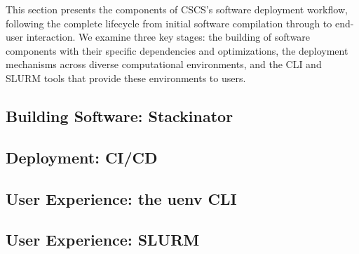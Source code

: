 This section presents the components of CSCS's software deployment workflow, following the complete lifecycle from initial software compilation through to end-user interaction.
We examine three key stages: the building of software components with their specific dependencies and optimizations, the deployment mechanisms across diverse computational environments, and the CLI and SLURM tools that provide these environments to users.

\subsection{Building Software: Stackinator}
\label{sec:stackinator}


\subsection{Deployment: CI/CD}
\label{sec:cicd}


\subsection{User Experience: the uenv CLI}
\label{sec:cli}


\subsection{User Experience: SLURM}
\label{sec:slurm}

